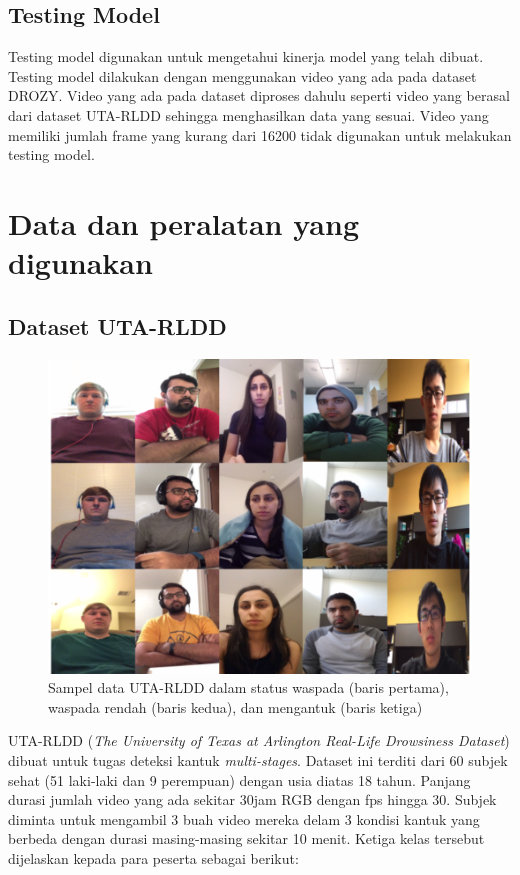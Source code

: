 \subsection{Testing Model}
Testing model digunakan untuk mengetahui kinerja model yang telah dibuat. Testing model
dilakukan dengan menggunakan video yang ada pada dataset DROZY. Video yang ada pada dataset
diproses dahulu seperti video yang berasal dari dataset UTA-RLDD sehingga menghasilkan
data yang sesuai. Video yang memiliki jumlah frame yang kurang dari 16200 tidak digunakan
untuk melakukan testing model.

\section{Data dan peralatan yang digunakan}
\subsection{Dataset UTA-RLDD}

\begin{figure} [H] \centering
      \includegraphics[scale=0.4]{gambar/utarldd.png}
      \caption{Sampel data UTA-RLDD dalam status waspada (baris pertama), waspada rendah (baris kedua), dan mengantuk (baris ketiga) \parencite{14}}
      \label{fig:utarldd}
\end{figure}

UTA-RLDD (\emph{The University of Texas at Arlington Real-Life Drowsiness Dataset}) dibuat untuk tugas deteksi kantuk \emph{multi-stages}.
Dataset ini terditi dari 60 subjek sehat (51 laki-laki dan 9 perempuan) dengan usia diatas 18 tahun. Panjang durasi jumlah
video yang ada sekitar 30jam RGB dengan fps hingga 30. Subjek diminta untuk mengambil 3 buah video mereka delam 3 kondisi
kantuk yang berbeda dengan durasi masing-masing sekitar 10 menit\parencite{14}. Ketiga kelas tersebut dijelaskan kepada para peserta sebagai
berikut:

